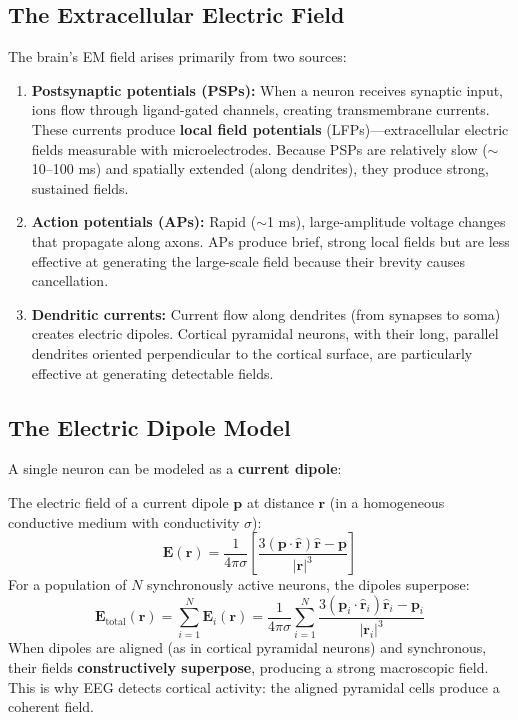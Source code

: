 \documentclass[11pt,a4paper]{report}
\begin{document}
\subsection{The Extracellular Electric Field}

The brain's EM field arises primarily from two sources:

\begin{mechbox}
\begin{enumerate}[leftmargin=1.5em]
  \item \textbf{Postsynaptic potentials (PSPs):} When a neuron receives synaptic input, ions flow through ligand-gated channels, creating transmembrane currents. These currents produce \textbf{local field potentials} (LFPs)---extracellular electric fields measurable with microelectrodes. Because PSPs are relatively slow ($\sim$10--100 ms) and spatially extended (along dendrites), they produce strong, sustained fields.
  \item \textbf{Action potentials (APs):} Rapid ($\sim$1 ms), large-amplitude voltage changes that propagate along axons. APs produce brief, strong local fields but are less effective at generating the large-scale field because their brevity causes cancellation.
  \item \textbf{Dendritic currents:} Current flow along dendrites (from synapses to soma) creates electric dipoles. Cortical pyramidal neurons, with their long, parallel dendrites oriented perpendicular to the cortical surface, are particularly effective at generating detectable fields.
\end{enumerate}
\end{mechbox}

\subsection{The Electric Dipole Model}

A single neuron can be modeled as a \textbf{current dipole}:

\begin{mathbox}
\vspace{-6pt}
The electric field of a current dipole $\mathbf{p}$ at distance $\mathbf{r}$ (in a homogeneous conductive medium with conductivity $\sigma$):
\[
  \mathbf{E}(\mathbf{r}) = \frac{1}{4\pi\sigma} \left[\frac{3(\mathbf{p} \cdot \hat{\mathbf{r}})\hat{\mathbf{r}} - \mathbf{p}}{|\mathbf{r}|^3}\right]
\]
For a population of $N$ synchronously active neurons, the dipoles superpose:
\[
  \mathbf{E}_{\text{total}}(\mathbf{r}) = \sum_{i=1}^{N} \mathbf{E}_i(\mathbf{r}) = \frac{1}{4\pi\sigma}\sum_{i=1}^{N} \frac{3(\mathbf{p}_i \cdot \hat{\mathbf{r}}_i)\hat{\mathbf{r}}_i - \mathbf{p}_i}{|\mathbf{r}_i|^3}
\]
When dipoles are aligned (as in cortical pyramidal neurons) and synchronous, their fields \textbf{constructively superpose}, producing a strong macroscopic field. This is why EEG detects cortical activity: the aligned pyramidal cells produce a coherent field.
\vspace{-4pt}
\end{mathbox}
\end{document}
